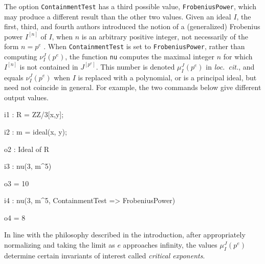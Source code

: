 \documentclass{amsart}
\begin{document}

The option {\tt ContainmentTest} has a third possible value, {\tt FrobeniusPower}, which may produce a different result than the other two values.
Given an ideal $I$, the first, third, and fourth authors introduced the notion of a (generalized) Frobenius power $I^{[n]}$ of $I$, when $n$ is an arbitrary positive integer, not necessarily of the form $n = p^e$ \cite{hernandez+etal.frobenius_powers}.
When {\tt ContainmentTest} is set to {\tt FrobeniusPower}, rather than  computing $\nu_I^J(p^e)$, the function {\tt nu} computes the
maximal integer $n$ for which $I^{[n]}$ is not contained in $J^{[p^e]}$.  This number is denoted $\mu_I^J(p^e)$ in \emph{loc.\ cit.}, and equals $\nu_I^J(p^e)$ when $I$ is replaced with a polynomial, or is a principal ideal, but need not coincide in general.
For example, the two commands below give different output values.

{\small
{}
\begin{MyVerbatim}

i1 : R = ZZ/3[x,y];

i2 : m = ideal(x, y);

o2 : Ideal of R

i3 : nu(3, m^5)

o3 = 10

i4 : nu(3, m^5, ContainmentTest => FrobeniusPower)

o4 = 8
\end{MyVerbatim}
}

\medspace
\noindent In line with the philosophy described in the introduction, after appropriately normalizing and taking the limit as $e$ approaches infinity, the values $\mu_I^J(p^e)$ determine certain invariants of interest called \emph{critical exponents}.






\end{document}
